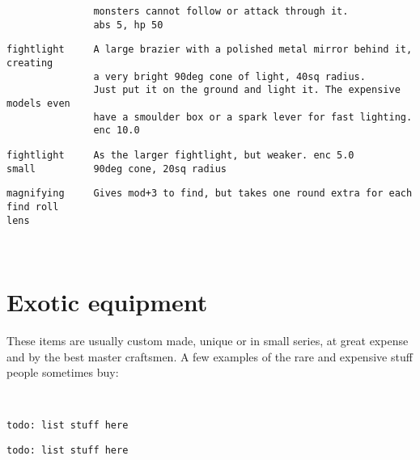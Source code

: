 \begin{samepage}
\begin{verbatim}
               monsters cannot follow or attack through it.
               abs 5, hp 50
\end{verbatim} \blocklistgap \begin{verbatim}
fightlight     A large brazier with a polished metal mirror behind it, creating
               a very bright 90deg cone of light, 40sq radius.
               Just put it on the ground and light it. The expensive models even
               have a smoulder box or a spark lever for fast lighting.
               enc 10.0
\end{verbatim} \blocklistgap \begin{verbatim}
fightlight     As the larger fightlight, but weaker. enc 5.0
small          90deg cone, 20sq radius
\end{verbatim} \blocklistgap \begin{verbatim}
magnifying     Gives mod+3 to find, but takes one round extra for each find roll
lens
\end{verbatim} \end{samepage} \normalsize

\












\section*{Exotic equipment}

These items are usually custom made, unique or in small series, at great expense and by the best master craftsmen. A few examples of the rare and expensive stuff people sometimes buy:

\

\small \begin{samepage} \begin{verbatim}
todo: list stuff here
\end{verbatim} \blocklistgap \begin{verbatim}
todo: list stuff here
\end{verbatim} \end{samepage} \normalsize

